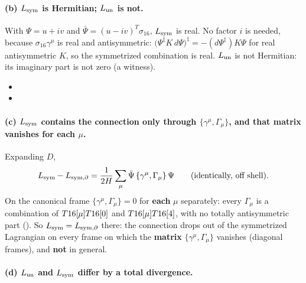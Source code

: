 \paragraph{(b) $L_{\mathrm{sym}}$ is Hermitian; $L_{\mathrm{un}}$ is not.} With $\Psi=u+iv$ and
$\bar\Psi=(u-iv)^{T}\sigma_{16}$, $L_{\mathrm{sym}}$ is real. No factor $i$ is needed, because
$\sigma_{16}\gamma^\mu$ is real and antisymmetric:
$\bigl(\Psi^{\ddagger}K\,d\Psi\bigr)^{\ddagger}=-(d\Psi^{\ddagger})K\Psi$ for real antisymmetric $K$, so
the symmetrized combination is real. $L_{\mathrm{un}}$ is not Hermitian: its imaginary part is not zero (a
witness). 
\begin{itemize}
  \item {}
  \item {}
\end{itemize}

\paragraph{(c) $L_{\mathrm{sym}}$ contains the connection only through $\{\gamma^\mu,\Gamma_\mu\}$, and that
matrix vanishes for each $\mu$.} Expanding $D$,
\[
  L_{\mathrm{sym}}-L_{\mathrm{sym},\partial}=\frac{1}{2H}\sum_\mu\bar\Psi\,\{\gamma^\mu,\Gamma_\mu\}\,\Psi\qquad\text{(identically, off shell)}.
\]
On the canonical frame $\{\gamma^\mu,\Gamma_\mu\}=0$ for \textbf{each} $\mu$ separately: every
$\Gamma_\mu$ is a combination of $T16[\mu]T16[0]$ and $T16[\mu]T16[4]$, with no totally
antisymmetric part (). So $L_{\mathrm{sym}}=L_{\mathrm{sym},\partial}$ there: the connection drops out of the
symmetrized Lagrangian on every frame on which the \textbf{matrix} $\{\gamma^\mu,\Gamma_\mu\}$
vanishes (diagonal frames), and \textbf{not} in general. 

\paragraph{(d) $L_{\mathrm{un}}$ and $L_{\mathrm{sym}}$ differ by a total divergence.} 

